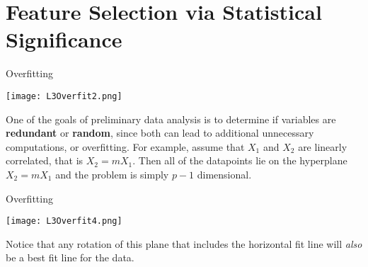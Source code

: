 \documentclass[10pt, table, dvipsnames,xcdraw, handout ]{beamer}
\begin{document}
\section{Feature Selection via Statistical Significance}


\begin{frame}[fragile]{Overfitting}
  \begin{minipage}[t][0.5\textheight][t]{\textwidth}
	\centering {}
	\texttt{[image: L3Overfit2.png]} 
  \end{minipage}
  \vfill
\begin{minipage}[t][0.5\textheight][t]{\textwidth}
One of the goals of preliminary data analysis is to determine if variables are \textbf{redundant} or \textbf{random}, since both can lead to additional unnecessary computations, or overfitting. For example, assume that $X_1$ and $X_2$ are linearly correlated, that is $X_2 = mX_1$. Then all of the datapoints lie on the hyperplane $X_2 = mX_1$ and the problem is simply $p-1$ dimensional. 
\end{minipage}
\end{frame}




\begin{frame}[fragile]{Overfitting}
  \begin{minipage}[t][0.5\textheight][t]{\textwidth}
	\centering {}
	\texttt{[image: L3Overfit4.png]} 
  \end{minipage}
  \vfill
\begin{minipage}[t][0.5\textheight][t]{\textwidth}
Notice that any rotation of this plane that includes the horizontal fit line will \emph{also} be a best fit line for the data.
\end{minipage}
\end{frame}
\end{document}
